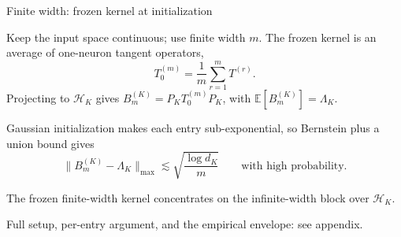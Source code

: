 \documentclass[10pt,aspectratio=169]{beamer}
\newcommand{\E}{\mathbb{E}}
\begin{document}
\begin{frame}{Finite width: frozen kernel at initialization}

	Keep the input space continuous; use finite width \(m\). The frozen kernel is an average of
	one-neuron tangent operators,
	\[
		T_0^{(m)}=\frac1m\sum_{r=1}^{m}T^{(r)} .
	\]
	Projecting to \(\mathcal H_K\) gives \(B_m^{(K)}=P_K T_0^{(m)}P_K\), with \(\E[B_m^{(K)}]=\Lambda_K\).

	\pause
	Gaussian initialization makes each entry sub-exponential, so Bernstein plus a union bound gives
	\[
		\bigl\|B_m^{(K)}-\Lambda_K\bigr\|_{\max}
		\lesssim
		\sqrt{\frac{\log d_K}{m}}
		\qquad\text{with high probability.}
	\]

	\medskip
	The frozen finite-width kernel concentrates on the infinite-width block over \(\mathcal H_K\).

	\medskip
	{\footnotesize Full setup, per-entry argument, and the empirical envelope: see appendix.}


\end{frame}
\end{document}
